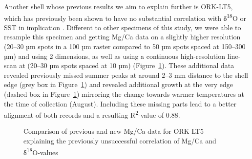 \documentclass[
  authoryear,
  preprint,
  3p]{elsarticle}
\begin{document}
Another shell whose previous results we aim to explain further is
ORK-LT5, which has previously been shown to have no substantial
correlation with δ\textsuperscript{18}O or SST in implication
\citep{Graniero2017-io}. Different to other specimens of this study, we
were able to resample this specimen and getting Mg/Ca data on a slightly
higher resolution (20--30 µm spots in a 100 µm raster compared to 50 µm
spots spaced at 150--300 µm) and using 2 dimensions, as well as using a
continuous high-resolution line-scan at (20--30 µm spots spaced at 10
µm) (Figure~\ref{fig-ORK_sub}). These additional data revealed
previously missed summer peaks at around 2--3 mm distance to the shell
edge (grey box in Figure~\ref{fig-ORK_sub}) and revealed additional
growth at the very edge (dashed box in Figure~\ref{fig-ORK_sub})
mirroring the change towards warmer temperatures at the time of
collection (August). Including these missing parts lead to a better
alignment of both records and a resulting R\textsuperscript{2}-value of
0.88.

\begin{figure}


\caption{\label{fig-ORK_sub}Comparison of previous and new Mg/Ca data
for ORK-LT5 explaining the previously unsuccessful correlation of Mg/Ca
and δ\textsuperscript{18}O-values}

\end{figure}%
\end{document}
